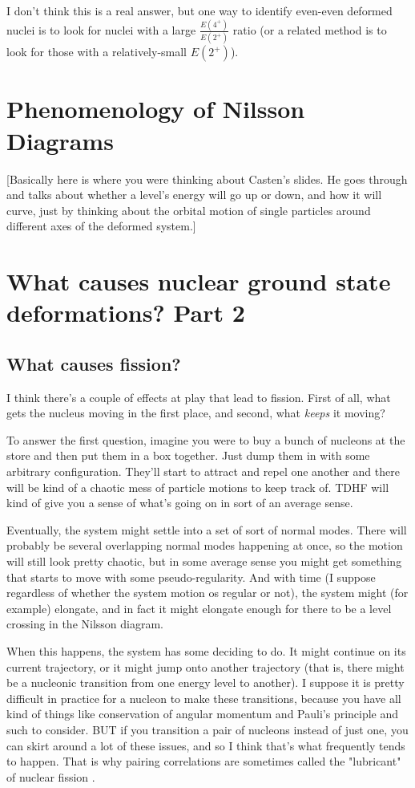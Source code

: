 I don't think this is a real answer, but one way to identify even-even deformed nuclei is to look for nuclei with a large $\frac{E(4^+)}{E(2^+)}$ ratio (or a related method is to look for those with a relatively-small $E(2^+)$).

\section{Phenomenology of Nilsson Diagrams}

[Basically here is where you were thinking about Casten's slides. He goes through and talks about whether a level's energy will go up or down, and how it will curve, just by thinking about the orbital motion of single particles around different axes of the deformed system.]

\section{What causes nuclear ground state deformations? Part 2}
\subsection{What causes fission?}

I think there's a couple of effects at play that lead to fission. First of all, what gets the nucleus moving in the first place, and second, what \textit{keeps} it moving?

To answer the first question, imagine you were to buy a bunch of nucleons at the store and then put them in a box together. Just dump them in with some arbitrary configuration. They'll start to attract and repel one another and there will be kind of a chaotic mess of particle motions to keep track of. TDHF will kind of give you a sense of what's going on in sort of an average sense.

Eventually, the system might settle into a set of sort of normal modes. There will probably be several overlapping normal modes happening at once, so the motion will still look pretty chaotic, but in some average sense you might get something that starts to move with some pseudo-regularity. And with time (I suppose regardless of whether the system motion os regular or not), the system might (for example) elongate, and in fact it might elongate enough for there to be a level crossing in the Nilsson diagram.

When this happens, the system has some deciding to do. It might continue on its current trajectory, or it might jump onto another trajectory (that is, there might be a nucleonic transition from one energy level to another). I suppose it is pretty difficult in practice for a nucleon to make these transitions, because you have all kind of things like conservation of angular momentum and Pauli's principle and such to consider. BUT if you transition a pair of nucleons instead of just one, you can skirt around a lot of these issues, and so I think that's what frequently tends to happen. That is why pairing correlations are sometimes called the "lubricant" of nuclear fission \cite{Bulgac2016}.

